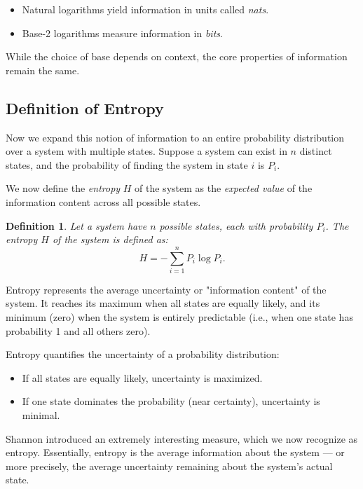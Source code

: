\documentclass[12pt,a4paper]{article}
\newtheorem{definition}{Definition}[section]
\newenvironment{defbox}[1][]{%
  \begin{tcolorbox}[enhanced, breakable, colback=defcolor, colframe=green!50!black, title=#1, fonttitle=\bfseries, arc=3pt, boxrule=0.5pt]
}{\end{tcolorbox}}
\newenvironment{rembox}[1][]{%
  \begin{tcolorbox}[enhanced, breakable, colback=gray!5, colframe=gray!50, title=#1, fonttitle=\bfseries, arc=3pt, boxrule=0.5pt]
}{\end{tcolorbox}}
\begin{document}
\begin{rembox}[Logarithm Bases and Information Units]
\begin{itemize}
    \item Natural logarithms yield information in units called \emph{nats}.
    \item Base-2 logarithms measure information in \emph{bits}.
\end{itemize}
While the choice of base depends on context, the core properties of information remain the same.
\end{rembox}

\subsection{Definition of Entropy}
Now we expand this notion of information to an entire probability distribution over a system with multiple states. Suppose a system can exist in $n$ distinct states, and the probability of finding the system in state $i$ is $P_i$.

We now define the \emph{entropy} $H$ of the system as the \emph{expected value} of the information content across all possible states.

\begin{defbox}[Entropy of a System]
\begin{definition}
Let a system have $n$ possible states, each with probability $P_i$. The entropy $H$ of the system is defined as:
\[
H = - \sum_{i=1}^n P_i \log P_i.
\]
\end{definition}
\end{defbox}

Entropy represents the average uncertainty or "information content" of the system. It reaches its maximum when all states are equally likely, and its minimum (zero) when the system is entirely predictable (i.e., when one state has probability 1 and all others zero).

\begin{rembox}[Intuition Behind Entropy]
Entropy quantifies the uncertainty of a probability distribution:
\begin{itemize}
    \item If all states are equally likely, uncertainty is maximized.
    \item If one state dominates the probability (near certainty), uncertainty is minimal.
\end{itemize}
\end{rembox}
Shannon introduced an extremely interesting measure, which we now recognize as entropy. Essentially, entropy is the average information about the system — or more precisely, the average uncertainty remaining about the system's actual state.
\end{document}
